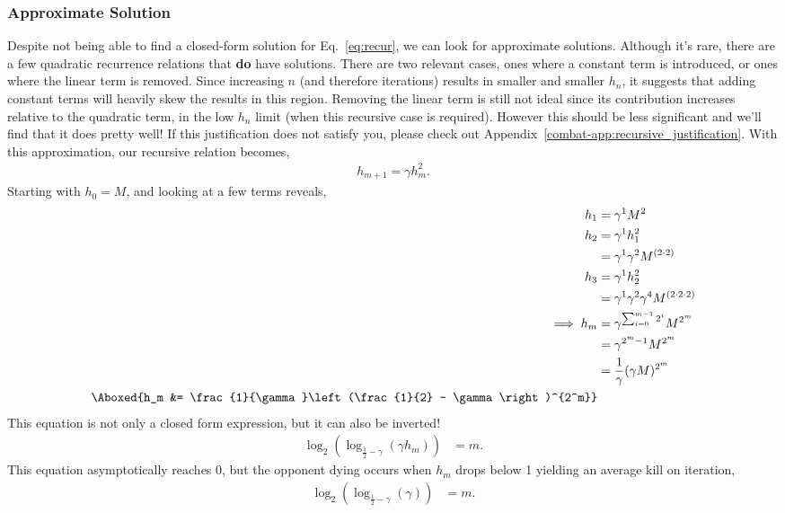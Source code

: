 	\subsubsection{Approximate Solution}
			Despite not being able to find a closed-form solution for Eq.~\ref{eq:recur}, we can look for approximate solutions. Although it's rare, there are a few quadratic recurrence relations that \textbf{do} have solutions. There are two relevant cases, ones where a constant term is introduced, or ones where the linear term is removed. Since increasing $n$ (and therefore iterations) results in smaller and smaller $h_n$, it suggests that adding constant terms will heavily skew the results in this region. Removing the linear term is still not ideal since its contribution increases relative to the quadratic term, in the low $h_n$ limit (when this recursive case is required). However this should be less significant and we'll find that it does pretty well! If this justification does not satisfy you, please check out Appendix~\ref{combat-app:recursive_justification}. With this approximation, our recursive relation becomes,
			\begin{align}\label{eq:simplified_recursion}
				h_{m+1} = \gamma h_m^2.
			\end{align}
			Starting with $h_0 = M$, and looking at a few terms reveals,
			\begin{align}
				h_{1} &= \gamma^1 M^2\\
				h_{2} &= \gamma^1 h_1^2\\
					&= \gamma^1 \gamma^2 M^{(2\cdot2)}\\
				h_{3} &= \gamma^1 h_2^2\\
					&= \gamma^1 \gamma^2 \gamma^4 M^{(2\cdot2\cdot2)}\\
				\implies h_m &= \gamma^{\sum_{i=0}^{m-1} 2^i} M^{2^m}\\
							&= \gamma^{2^m-1} M^{2^m}\\
							&= \frac{1}{\gamma}(\gamma M)^{2^m}\\
						\Aboxed{h_m &= \frac{1}{\gamma}\left(\frac{1}{2} - \gamma\right)^{2^m}}
			\end{align}
			This equation is not only a closed form expression, but it can also be inverted!
			\begin{align}\label{eq:approximate_m}
				\log_2(\log_{\frac{1}{2} - \gamma} (\gamma h_m)) &= m.
			\end{align}
			This equation asymptotically reaches 0, but the opponent dying occurs when $h_m$ drops below 1 yielding an average kill on iteration,
			\begin{align}
				\log_2(\log_{\frac{1}{2} - \gamma} (\gamma)) &= m.
			\end{align}

